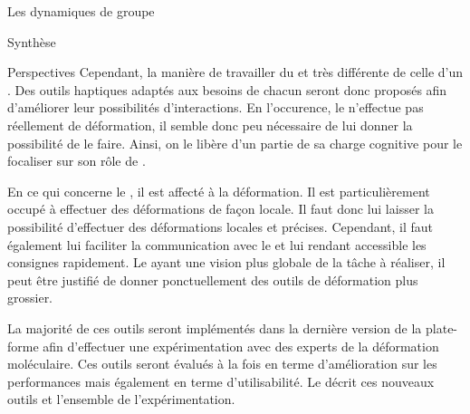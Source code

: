 \documentclass[myfrancais]{mythesis}
\begin{document}
\begin{mychapter}{Les dynamiques de groupe}
\begin{mysection}{Synthèse}
\begin{mysubsection}{Perspectives}
				Cependant, la manière de travailler du  et très différente de celle d'un .
				Des outils haptiques adaptés aux besoins de chacun seront donc proposés afin d'améliorer leur possibilités d'interactions.
				En l'occurence, le  n'effectue pas réellement de déformation, il semble donc peu nécessaire de lui donner la possibilité de le faire.
				Ainsi, on le libère d'un partie de sa charge cognitive pour le focaliser sur son rôle de .

				En ce qui concerne le , il est affecté à la déformation.
				Il est particulièrement occupé à effectuer des déformations de façon locale.
				Il faut donc lui laisser la possibilité d'effectuer des déformations locales et précises.
				Cependant, il faut également lui faciliter la communication avec le  et lui rendant accessible les consignes rapidement.
				Le  ayant une vision plus globale de la tâche à réaliser, il peut être justifié de donner ponctuellement des outils de déformation plus grossier.

				La majorité de ces outils seront implémentés dans la dernière version de la plate-forme afin d'effectuer une expérimentation avec des experts de la déformation moléculaire.
				Ces outils seront évalués à la fois en terme d'amélioration sur les performances mais également en terme d'utilisabilité.
				Le  décrit ces nouveaux outils et l'ensemble de l'expérimentation.
			\end{mysubsection}
		\end{mysection}
	\end{mychapter}
\end{document}
